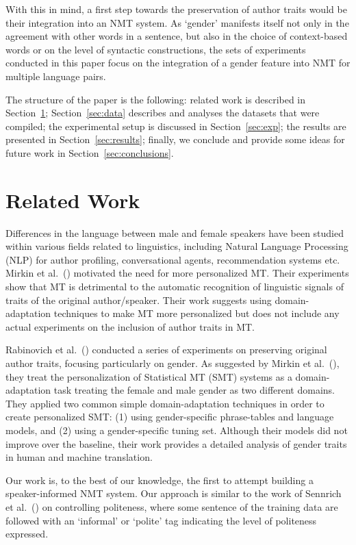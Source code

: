 With this in mind, a first step towards the preservation of author traits would be their integration into an NMT system. As `gender' manifests itself not only in the agreement with other words in a sentence, but also in the choice of context-based words or on the level of syntactic constructions, the sets of experiments conducted in this paper focus on the integration of a gender feature into NMT for multiple language pairs. 

 The structure of the paper is the following: related work is described in Section~\ref{sec:relwork}; Section~\ref{sec:data} describes and analyses the datasets that were compiled; the experimental setup is discussed in Section~\ref{sec:exp}; the results are presented in Section~\ref{sec:results}; finally, we conclude and provide some ideas for future work in Section~\ref{sec:conclusions}.

\section{Related Work}\label{sec:relwork}

Differences in the language between male and female speakers have been studied within various fields related to linguistics, including Natural Language Processing (NLP) for author profiling, conversational agents, recommendation systems etc. Mirkin et al.~(\citeyear{Mirkin2015}) motivated the need for more personalized MT. Their experiments show that MT is detrimental to the automatic recognition of linguistic signals of traits of the original author/speaker. Their work suggests using domain-adaptation techniques to make MT more personalized but does not include any actual experiments on the inclusion of author traits in MT.

Rabinovich et al.~(\citeyear{Rabinovich2016}) conducted a series of experiments on preserving original author traits, focusing particularly on gender. As suggested by Mirkin et al.~(\citeyear{Mirkin2015}), they treat the personalization of Statistical MT (SMT) systems as a domain-adaptation task treating the female and male gender as two different domains. They applied two common simple domain-adaptation techniques in order to create personalized SMT: (1) using gender-specific phrase-tables and language models, and (2) using a gender-specific tuning set. Although their models did not improve over the baseline, their work provides a detailed analysis of gender traits in human and machine translation. 

Our work is, to the best of our knowledge, the first to attempt building a speaker-informed NMT system. Our approach is similar to the work of Sennrich et al.~(\citeyear{Sennrich2016control}) on controlling politeness, where some sentence of the training data are followed with an `informal' or `polite' tag indicating the level of politeness expressed.







